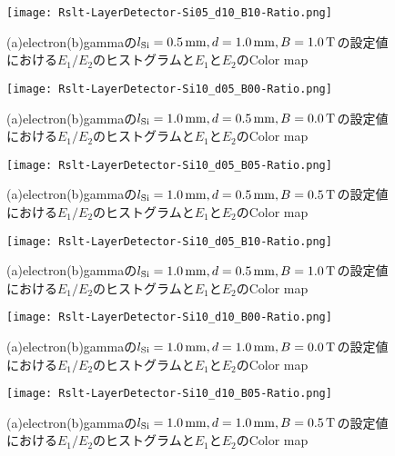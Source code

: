 \documentclass[a4paper,10pt]{jreport}
\begin{document}
\begin{figure}[H]
	\center
	\texttt{[image: Rslt-LayerDetector-Si05\_d10\_B10-Ratio.png]}
	\caption{(a)electron(b)gammaの$l_{\rm{Si}}=\SI{0.5}{mm}, d=\SI{1.0}{mm}, B=\SI{1.0}{T}$の設定値における$E_1/E_2$のヒストグラムと$E_1$と$E_2$のColor map}
	\label{Rslt-LayerDetector-Si05_d10_B10-Ratio}
\end{figure}

\begin{figure}[H]
	\center
	\texttt{[image: Rslt-LayerDetector-Si10\_d05\_B00-Ratio.png]}
	\caption{(a)electron(b)gammaの$l_{\rm{Si}}=\SI{1.0}{mm}, d=\SI{0.5}{mm}, B=\SI{0.0}{T}$の設定値における$E_1/E_2$のヒストグラムと$E_1$と$E_2$のColor map}
	\label{Rslt-LayerDetector-Si10_d05_B00-Ratio}
\end{figure}

\begin{figure}[H]
	\center
	\texttt{[image: Rslt-LayerDetector-Si10\_d05\_B05-Ratio.png]}
	\caption{(a)electron(b)gammaの$l_{\rm{Si}}=\SI{1.0}{mm}, d=\SI{0.5}{mm}, B=\SI{0.5}{T}$の設定値における$E_1/E_2$のヒストグラムと$E_1$と$E_2$のColor map}
	\label{Rslt-LayerDetector-Si10_d05_B05-Ratio}
\end{figure}

\begin{figure}[H]
	\center
	\texttt{[image: Rslt-LayerDetector-Si10\_d05\_B10-Ratio.png]}
	\caption{(a)electron(b)gammaの$l_{\rm{Si}}=\SI{1.0}{mm}, d=\SI{0.5}{mm}, B=\SI{1.0}{T}$の設定値における$E_1/E_2$のヒストグラムと$E_1$と$E_2$のColor map}
	\label{Rslt-LayerDetector-Si10_d05_B10-Ratio}
\end{figure}

\begin{figure}[H]
	\center
	\texttt{[image: Rslt-LayerDetector-Si10\_d10\_B00-Ratio.png]}
	\caption{(a)electron(b)gammaの$l_{\rm{Si}}=\SI{1.0}{mm}, d=\SI{1.0}{mm}, B=\SI{0.0}{T}$の設定値における$E_1/E_2$のヒストグラムと$E_1$と$E_2$のColor map}
	\label{Rslt-LayerDetector-Si10_d10_B00-Ratio}
\end{figure}

\begin{figure}[H]
	\center
	\texttt{[image: Rslt-LayerDetector-Si10\_d10\_B05-Ratio.png]}
	\caption{(a)electron(b)gammaの$l_{\rm{Si}}=\SI{1.0}{mm}, d=\SI{1.0}{mm}, B=\SI{0.5}{T}$の設定値における$E_1/E_2$のヒストグラムと$E_1$と$E_2$のColor map}
	\label{Rslt-LayerDetector-Si10_d10_B05-Ratio}
\end{figure}
\end{document}
